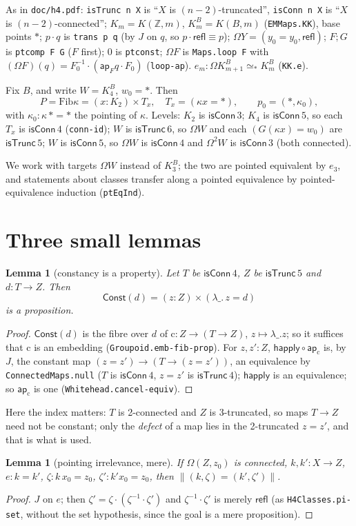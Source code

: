 \documentclass[11pt]{amsart}
\newtheorem{lemma}[theorem]{Lemma}
\theoremstyle{definition}
\theoremstyle{remark}
\newcommand{\Om}{\Omega}
\newcommand{\Z}{\mathbb{Z}}
\newcommand{\code}[1]{\texttt{#1}}
\newcommand{\cT}{\mathsf{isTrunc}}
\newcommand{\cC}{\mathsf{isConn}}
\newcommand{\refl}{\mathsf{refl}}
\newcommand{\ap}{\mathsf{ap}}
\newcommand{\Fib}{\mathrm{Fib}}
\newcommand{\Const}{\mathsf{Const}}
\newcommand{\tr}[1]{\|#1\|}
\begin{document}
As in \code{doc/h4.pdf}: \code{isTrunc n X} is ``$X$ is
$(n-2)$-truncated'', \code{isConn n X} is ``$X$ is $(n-2)$-connected'';
$K_m=K(\Z,m)$, $K^B_m=K(B,m)$ (\code{EMMaps.KK}), base points $*$;
$p\cdot q$ is \code{trans p q} (by $J$ on $q$, so $p\cdot\refl\equiv p$);
$\Om Y=(y_0=y_0,\refl)$; $F;G$ is \code{ptcomp F G} ($F$ first); $0$ is
\code{ptconst}; $\Om F$ is \code{Maps.loop F} with
$(\Om F)(q)=F_0^{-1}\cdot(\ap_F q\cdot F_0)$ (\code{loop-ap}).
$e_m:\Om K^B_{m+1}\simeq_*K^B_m$ (\code{KK.e}).

Fix $B$, and write $W=K^B_4$, $w_0=*$. Then
\[P=\Fib\kappa=(x:K_2)\times T_x,\quad T_x=(\kappa x=*),\qquad
p_0=(*,\kappa_0),\]
with $\kappa_0:\kappa\,*=*$ the pointing of $\kappa$.
Levels: $K_2$ is $\cC\,3$; $K_4$ is $\cC\,5$, so each $T_x$ is $\cC\,4$
(\code{conn-id}); $W$ is $\cT\,6$, so $\Om W$ and each
$(G(\kappa x)=w_0)$ are $\cT\,5$; $W$ is $\cC\,5$, so $\Om W$ is $\cC\,4$
and $\Om^2W$ is $\cC\,3$ (both connected).

We work with targets $\Om W$ instead of $K^B_3$; the two are pointed
equivalent by $e_3$, and statements about classes transfer along a
pointed equivalence by pointed-equivalence induction (\code{ptEqInd}).

\section{Three small lemmas}

\begin{lemma}[constancy is a property]\label{l:const}
Let $T$ be $\cC\,4$, $Z$ be $\cT\,5$ and $d:T\to Z$. Then
\[\Const(d)=(z:Z)\times(\lambda\_.\,z=d)\]
is a proposition.
\end{lemma}
\begin{proof}
$\Const(d)$ is the fibre over $d$ of $\mathrm{c}:Z\to(T\to Z)$,
$z\mapsto\lambda\_.z$; so it suffices that $\mathrm{c}$ is an embedding
(\code{Groupoid.emb-fib-prop}). For $z,z':Z$,
$\mathsf{happly}\circ\ap_{\mathrm{c}}$ is, by $J$, the constant map
$(z=z')\to(T\to(z=z'))$, an equivalence by \code{ConnectedMaps.null}
($T$ is $\cC\,4$, $z=z'$ is $\cT\,4$); $\mathsf{happly}$ is an
equivalence; so $\ap_{\mathrm{c}}$ is one (\code{Whitehead.cancel-equiv}).
\end{proof}
Here the index matters: $T$ is 2-connected and $Z$ is 3-truncated, so
maps $T\to Z$ need not be constant; only the \emph{defect} of a map lies
in the 2-truncated $z=z'$, and that is what is used.

\begin{lemma}[pointing irrelevance, mere]\label{l:pi}
If $\Om(Z,z_0)$ is connected, $k,k':X\to Z$, $e:k=k'$, $\zeta:k\,x_0=z_0$,
$\zeta':k'x_0=z_0$, then $\tr{(k,\zeta)=(k',\zeta')}$.
\end{lemma}
\begin{proof}
$J$ on $e$; then $\zeta'=\zeta\cdot(\zeta^{-1}\cdot\zeta')$ and
$\zeta^{-1}\cdot\zeta'$ is merely $\refl$ (as \code{H4Classes.pi-set},
without the set hypothesis, since the goal is a mere proposition).
\end{proof}
\end{document}
